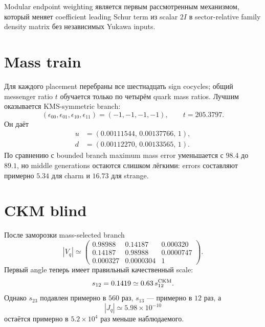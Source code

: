 \begin{proposition}
Modular endpoint weighting является первым рассмотренным механизмом, который
меняет coefficient leading Schur term из scalar \(2I\) в sector-relative
family density matrix без независимых Yukawa inputs.
\end{proposition}

\section{Mass train}

Для каждого placement перебраны все шестнадцать sign cocycles; общий
messenger ratio \(t\) обучается только по четырём quark mass ratios. Лучшим
оказывается KMS-symmetric branch:
\begin{equation}
 (\epsilon_{00},\epsilon_{01},\epsilon_{10},\epsilon_{11})
 =(-1,-1,-1,-1),
 \qquad t=205.3797.
\end{equation}
Он даёт
\begin{align}
 u&=(0.00111544,\,0.00137766,\,1),\\
 d&=(0.00112270,\,0.00133565,\,1).
\end{align}
По сравнению с bounded branch maximum mass error уменьшается с \(98.4\) до
\(89.1\), но middle generations остаются слишком лёгкими: errors составляют
примерно \(5.34\) для charm и \(16.73\) для strange.

\section{CKM blind}

После заморозки mass-selected branch
\begin{equation}
 |V_q|\simeq
 \begin{pmatrix}
 0.98988&0.14187&0.000320\\
 0.14187&0.98988&0.0000747\\
 0.000327&0.0000304&1
 \end{pmatrix}.
\end{equation}
Первый angle теперь имеет правильный качественный scale:
\begin{equation}
 s_{12}=0.1419\simeq0.63\,s_{12}^{\rm CKM}.
\end{equation}
Однако \(s_{23}\) подавлен примерно в \(560\) раз, \(s_{13}\) --- примерно в
\(12\) раз, а
\begin{equation}
 |J_q|\simeq5.98\times10^{-10}
\end{equation}
остаётся примерно в \(5.2\times10^4\) раз меньше наблюдаемого.

